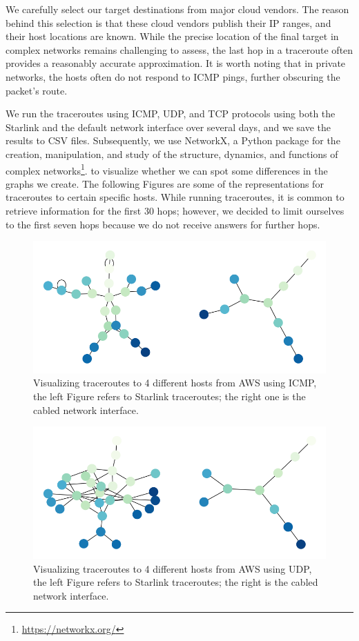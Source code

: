 \documentclass[IN,11pt,twoside,openright,idp,english]{tumthesis}
\begin{document}
We carefully select our target destinations from major cloud vendors. The reason behind this selection is that these
cloud vendors publish their IP ranges, and their host locations are known. While the precise location of the final
target in complex networks remains challenging to assess, the last hop in a traceroute often provides a reasonably
accurate approximation. It is worth noting that in private networks, the hosts often do not respond to ICMP pings,
further obscuring the packet's route.

We run the traceroutes using ICMP, UDP, and TCP protocols using both the Starlink and the default network interface over
several days, and we save the results to CSV files. Subsequently, we use NetworkX, a Python package for the creation,
manipulation, and study of the structure, dynamics, and functions of complex
networks\footnote{\url{https://networkx.org/}}. to visualize whether we can spot some differences in the graphs we
create. 
The following Figures are some of the representations for traceroutes to certain specific hosts. While running
traceroutes, it is common to retrieve information for the first 30 hops; however, we decided to limit ourselves to the
first seven hops because we do not receive answers for further hops. 

\begin{figure}
    \label{fig:tr_aws_icmp}
    \centering
    \includegraphics[width=0.6\columnwidth]{img/tr_aws_icmp.png}
    \caption{Visualizing traceroutes to 4 different hosts from AWS using ICMP, the left Figure refers to Starlink traceroutes; the right one is the cabled network interface.}
\end{figure}
    
\begin{figure}
    \label{fig:tr_aws_udp}
    \centering
    \includegraphics[width=0.6\columnwidth]{img/tr_aws_udp.png}
    \caption{Visualizing traceroutes to 4 different hosts from AWS using UDP, the left Figure refers to Starlink traceroutes; the right is the cabled network interface.}
\end{figure}
    
\end{document}
